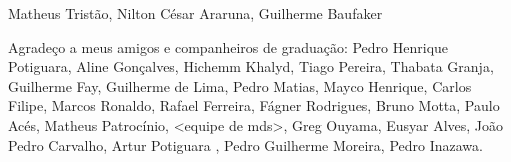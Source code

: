 \begin{agradecimentos}

Matheus Tristão, Nilton César Araruna, Guilherme Baufaker


Agradeço a meus amigos e companheiros de graduação: Pedro Henrique Potiguara, Aline Gonçalves, Hichemm Khalyd, Tiago Pereira, Thabata Granja, Guilherme Fay, Guilherme de Lima, Pedro Matias, Mayco Henrique, Carlos Filipe, Marcos Ronaldo, Rafael Ferreira, Fágner Rodrigues, Bruno Motta, Paulo Acés, Matheus Patrocínio, <equipe de mds>, Greg Ouyama, Eusyar Alves, João Pedro Carvalho, Artur Potiguara , Pedro Guilherme Moreira, Pedro Inazawa.


\end{agradecimentos}
